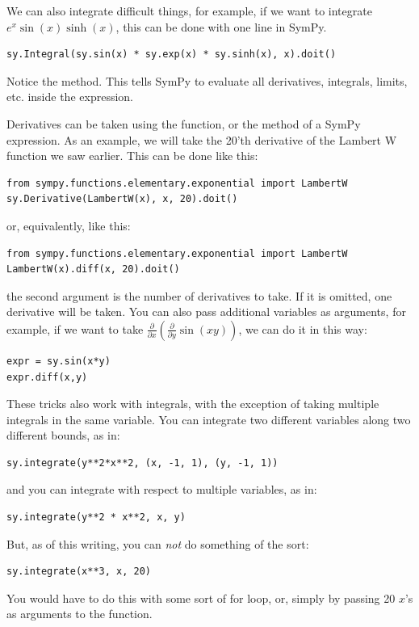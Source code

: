 We can also integrate difficult things, for example, if we want to integrate $e^x\sin(x)\sinh(x)$, this can be done with one line in SymPy.
\begin{lstlisting}
sy.Integral(sy.sin(x) * sy.exp(x) * sy.sinh(x), x).doit()
\end{lstlisting}
Notice the  method.
This tells SymPy to evaluate all derivatives, integrals, limits, etc. inside the expression.

Derivatives can be taken using the  function, or the  method of a SymPy expression.
As an example, we will take the 20'th derivative of the Lambert W function we saw earlier.
This can be done like this:
\begin{lstlisting}
from sympy.functions.elementary.exponential import LambertW
sy.Derivative(LambertW(x), x, 20).doit()
\end{lstlisting}
or, equivalently, like this:
\begin{lstlisting}
from sympy.functions.elementary.exponential import LambertW
LambertW(x).diff(x, 20).doit()
\end{lstlisting}
the second argument is the number of derivatives to take.
If it is omitted, one derivative will be taken.
You can also pass additional variables as arguments, for example, if we want to take $\frac{\partial}{\partial x} \left( \frac{\partial}{\partial y}\sin\left(x y\right)\right)$, we can do it in this way:
\begin{lstlisting}
expr = sy.sin(x*y)
expr.diff(x,y)
\end{lstlisting}
These tricks also work with integrals, with the exception of taking multiple integrals in the same variable.
You can integrate two different variables along two different bounds, as in:
\begin{lstlisting}
sy.integrate(y**2*x**2, (x, -1, 1), (y, -1, 1))
\end{lstlisting}
and you can integrate with respect to multiple variables, as in:
\begin{lstlisting}
sy.integrate(y**2 * x**2, x, y)
\end{lstlisting}
But, as of this writing, you can \emph{not} do something of the sort:
\begin{lstlisting}
sy.integrate(x**3, x, 20)
\end{lstlisting}
You would have to do this with some sort of for loop, or, simply by passing 20 $x$'s as arguments to the function.

